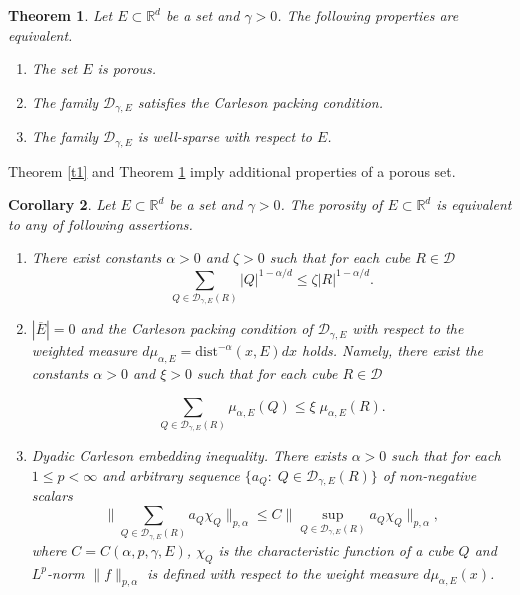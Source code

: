 \documentclass[12pt]{amsart} \setlength{\textwidth}{15cm} \setlength{\textheight}{24cm} \setlength{\voffset}{-1cm} \setlength{\oddsidemargin}{-0.4cm} \setlength{\evensidemargin}{-0.4cm}
\newtheorem {theorem} {Theorem}
\newtheorem {corollary} [theorem]{Corollary}
\theoremstyle{definition}
\theoremstyle{remark}
\begin{document}
\begin{theorem} \label{t3}
Let   $E\subset\mathbb{R}^d$ be a set and $\gamma >0$.  The following properties are equivalent.
\begin{enumerate}
  \item[(i)] The set $E$ is porous.
  \item[(ii)] The family
 $\mathcal{D}_{\gamma, E}$  satisfies the   Carleson packing condition.
 \item[(iii)] The family
 $\mathcal{D}_{\gamma, E}$  is well-sparse with respect to $E$.
      \end{enumerate}
   \end{theorem}
Theorem \ref{t1} and Theorem \ref{t3} imply additional properties of a porous set.
\begin{corollary}\label{cor3}
Let   $E\subset\mathbb{R}^d$ be a set and $\gamma >0$. The porosity of    $E\subset\mathbb{R}^d$ is  equivalent to any of following assertions.
  \begin{enumerate}
   \item[(i)] There exist constants $\alpha >0$ and $\zeta>0$ such that  for each cube $R \in \mathcal{D}$
 \[ \sum_{Q \in \mathcal{D}_{\gamma, E} (R)}|Q|^{1-\alpha /d}\leq \zeta |R|^{1-\alpha /d}.\]
   \item[(ii)]    $|\overline{E}|=0$ and the Carleson packing condition of $\mathcal{D}_{\gamma, E}$ with respect to the weighted measure
 $d\mu_{\alpha,E}=\mathrm{dist}^{-\alpha }(x, E)dx $ holds. Namely,
    there exist the  constants $\alpha > 0$ and $\xi>0$ such that for each cube $R \in \mathcal{D}$

\[ \sum _ {Q \in \mathcal{D}_{\gamma, E}(R)}\mu_{\alpha,E}(Q)\leq \xi\;\mu_{\alpha,E}(R).\]
\item[(iii)] Dyadic Carleson embedding inequality. There exists $\alpha >0$ such that for each  $1\leq p< \infty$  and arbitrary sequence $\{a_Q: \; Q \in \mathcal{D}_{\gamma, E}(R) \}$ of non-negative scalars
\begin{equation}\label{e_t2}
  \bigg \|\sum_{Q \in \mathcal{D}_{ \gamma, E}(R)} a_Q \chi_Q\bigg\|_{p,\alpha} \leq C
\bigg
\|\sup_{Q \in\mathcal{D}_{\gamma, E}(R)} a_Q \chi_Q \bigg\|_{p,\alpha},
\end{equation}
where $C=C(\alpha, p, \gamma, E)$, $\chi_Q$ is the characteristic function of a cube $Q$ and  $L^p$-norm $\|f\|_{p,\alpha}$ is defined with respect to the weight measure
     $ d\mu_{\alpha,E}(x)$.
 \end{enumerate}
\end{corollary}
\end{document}
